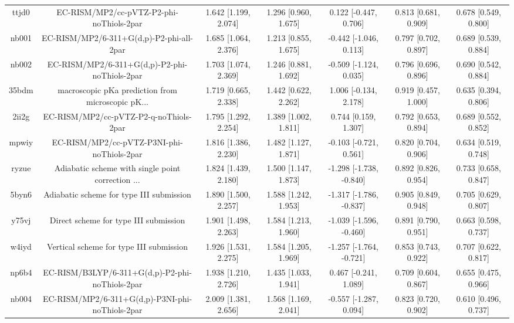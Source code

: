 \documentclass{article}
\begin{document}
\begin{center}
\begin{longtable}{|ccccccc|}
 ttjd0 &           EC-RISM/MP2/cc-pVTZ-P2-phi-noThiols-2par &  1.642 [1.199, 2.074] &  1.296 [0.960, 1.675] &    0.122 [-0.447, 0.706] &  0.813 [0.681, 0.909] &   0.678 [0.549, 0.800] \\
 nb001 &           EC-RISM/MP2/6-311+G(d,p)-P2-phi-all-2par &  1.685 [1.064, 2.376] &  1.213 [0.855, 1.675] &   -0.442 [-1.046, 0.113] &  0.797 [0.702, 0.897] &   0.689 [0.539, 0.884] \\
 nb002 &      EC-RISM/MP2/6-311+G(d,p)-P2-phi-noThiols-2par &  1.703 [1.074, 2.369] &  1.246 [0.881, 1.692] &   -0.509 [-1.124, 0.035] &  0.796 [0.696, 0.896] &   0.690 [0.542, 0.884] \\
 35bdm &  macroscopic pKa prediction from microscopic pK... &  1.719 [0.665, 2.338] &  1.442 [0.622, 2.262] &    1.006 [-0.134, 2.178] &  0.919 [0.457, 1.000] &   0.635 [0.394, 0.806] \\
 2ii2g &             EC-RISM/MP2/cc-pVTZ-P2-q-noThiols-2par &  1.795 [1.292, 2.254] &  1.389 [1.002, 1.811] &     0.744 [0.159, 1.307] &  0.792 [0.653, 0.894] &   0.689 [0.552, 0.852] \\
 mpwiy &         EC-RISM/MP2/cc-pVTZ-P3NI-phi-noThiols-2par &  1.816 [1.386, 2.230] &  1.482 [1.127, 1.871] &   -0.103 [-0.721, 0.561] &  0.820 [0.704, 0.906] &   0.634 [0.519, 0.748] \\
 ryzue &  Adiabatic scheme with single point correction ... &  1.824 [1.439, 2.180] &  1.500 [1.147, 1.873] &  -1.298 [-1.738, -0.840] &  0.892 [0.826, 0.954] &   0.733 [0.658, 0.847] \\
 5byn6 &           Adiabatic scheme for type III submission &  1.890 [1.500, 2.257] &  1.588 [1.242, 1.953] &  -1.317 [-1.786, -0.837] &  0.905 [0.849, 0.948] &   0.705 [0.629, 0.807] \\
 y75vj &              Direct scheme for type III submission &  1.901 [1.498, 2.263] &  1.584 [1.213, 1.960] &  -1.039 [-1.596, -0.460] &  0.891 [0.790, 0.951] &   0.663 [0.598, 0.737] \\
 w4iyd &            Vertical scheme for type III submission &  1.926 [1.531, 2.275] &  1.584 [1.205, 1.969] &  -1.257 [-1.764, -0.721] &  0.853 [0.743, 0.922] &   0.707 [0.622, 0.817] \\
 np6b4 &    EC-RISM/B3LYP/6-311+G(d,p)-P2-phi-noThiols-2par &  1.938 [1.210, 2.726] &  1.435 [1.033, 1.941] &    0.467 [-0.241, 1.089] &  0.709 [0.604, 0.867] &   0.655 [0.475, 0.966] \\
 nb004 &    EC-RISM/MP2/6-311+G(d,p)-P3NI-phi-noThiols-2par &  2.009 [1.381, 2.656] &  1.568 [1.169, 2.041] &   -0.557 [-1.287, 0.094] &  0.823 [0.720, 0.902] &   0.610 [0.496, 0.737] \\

\end{longtable}
\end{center}
\end{document}
